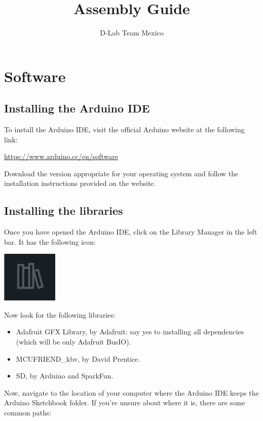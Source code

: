 \documentclass{article}
\title{Assembly Guide}
\author{D-Lab Team Mexico}
\begin{document}
\maketitle

\section{Software}
\subsection{Installing the Arduino IDE}
To install the Arduino IDE, visit the official Arduino website at the following link:

\href{https://www.arduino.cc/en/software}{https://www.arduino.cc/en/software}

\noindent
Download the version appropriate for your operating system and follow the installation instructions provided on the website.

\subsection{Installing the libraries}


Once you have opened the Arduino IDE, click on the Library Manager in the left bar. It has the following icon:

\vspace{1em}
\begin{center}
    \includegraphics[width=0.2\textwidth]{../images/library_manager.png}
\end{center}

Now look for the following libraries:

\begin{itemize}
    \item Adafruit GFX Library, by Adafruit: say yes to installing all dependencies (which will be only Adafruit BusIO).
    \item MCUFRIEND\_kbv, by David Prentice.
    \item SD, by Arduino and SparkFun.
\end{itemize}

\noindent
Now, navigate to the location of your computer where the Arduino IDE keeps the Arduino Sketchbook folder. If you're unsure about where it is, there are some common paths:
\end{document}
